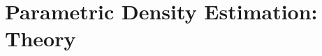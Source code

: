\chapter{Parametric Density Estimation: Theory}
\begin{refsection}
%
\printbibliography[heading=subbibliography]
\end{refsection}